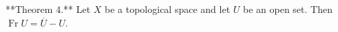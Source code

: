 **Theorem 4.** Let $X$ be a topological space and let $U$ be an open set. Then $\operatorname{Fr} U = \overline{U} - U$.
